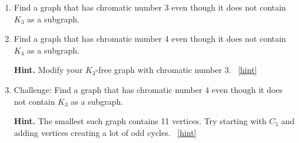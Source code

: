 \documentclass{book}
\begin{document}
\setcounter{project}{43}
\addtocounter{project}{-1}
\begin{activity}[]\label{activity-36}
\leavevmode%
\begin{enumerate}[font=\bfseries,label=(\alph*),ref=\alph*]
\item\label{task-57} \hypertarget{p-393}{}%
Find a graph that has chromatic number 3 even though it does not contain \(K_3\) as a subgraph.%
\item\label{task-58} \hypertarget{p-394}{}%
Find a graph that has chromatic number 4 even though it does not contain \(K_4\) as a subgraph.%
\par\smallskip%
\noindent\textbf{Hint.}\hypertarget{hint-16}{}\quad%
\hypertarget{p-395}{}%
Modify your \(K_3\)-free graph with chromatic number 3.%
~\hfill{\tiny\hyperlink{a-43.b}{[hint]}\hypertarget{q-43.b}{}}\item\label{task-59} \hypertarget{p-396}{}%
Challenge: Find a graph that has chromatic number 4 even though it does not contain \(K_3\) as a subgraph.%
\par\smallskip%
\noindent\textbf{Hint.}\hypertarget{hint-17}{}\quad%
\hypertarget{p-397}{}%
The smallest such graph contains 11 vertices.  Try starting with \(C_5\) and adding vertices creating a lot of odd cycles.%
~\hfill{\tiny\hyperlink{a-43.c}{[hint]}\hypertarget{q-43.c}{}}\end{enumerate}
\end{activity}

\clearpage
\end{document}
